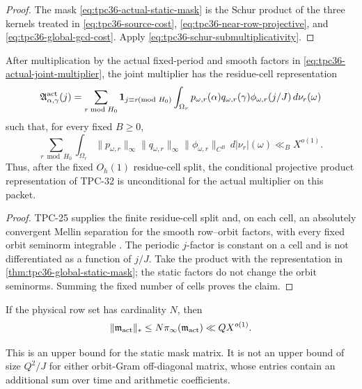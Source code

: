 \begin{proof}
The mask \eqref{eq:tpc36-actual-static-mask} is the Schur product of the
three kernels treated in \eqref{eq:tpc36-source-cost},
\eqref{eq:tpc36-near-row-projective}, and
\eqref{eq:tpc36-global-gcd-cost}.  Apply
\eqref{eq:tpc36-schur-submultiplicativity}.
\end{proof}

\begin{corollary}
\label{cor:tpc36-full-multiplier-reassembly}
After multiplication by the actual fixed-period and smooth factors in
\eqref{eq:tpc36-actual-joint-multiplier}, the joint multiplier has the
residue-cell representation
\begin{equation}
 \mathfrak A_{\alpha,\gamma}^{\rm act}(j)
 =\sum_{r\bmod H_0}\mathbf 1_{j\equiv r\!\!\!\pmod{H_0}}
 \int_{\Omega_r}p_{\omega,r}(\alpha)q_{\omega,r}(\gamma)
 \phi_{\omega,r}(j/J)\,d\nu_r(\omega)
 \label{eq:tpc36-full-multiplier-reassembly}
\end{equation}
such that, for every fixed \(B\ge0\),
\begin{equation}
 \sum_{r\bmod H_0}\int_{\Omega_r}
 \|p_{\omega,r}\|_\infty\|q_{\omega,r}\|_\infty
 \|\phi_{\omega,r}\|_{C^B}\,d|\nu_r|(\omega)
 \ll_B X^{o(1)}.
 \label{eq:tpc36-orbit-seminorm-cost}
\end{equation}
Thus, after the fixed \(O_h(1)\) residue-cell split, the conditional
projective product representation of TPC-32 is unconditional for the
actual multiplier on this packet.
\end{corollary}

\begin{proof}
TPC-25 supplies the finite residue-cell split and, on each cell, an
absolutely convergent Mellin separation for the smooth row--orbit factors,
with every fixed orbit seminorm integrable \citep{WangTPC25}.  The
periodic \(j\)-factor is constant on a cell and is not differentiated as a
function of \(j/J\).  Take the product with the representation in
\cref{thm:tpc36-global-static-mask}; the static factors do not change the
orbit seminorms.  Summing the fixed number of cells proves the claim.
\end{proof}

\begin{corollary}
\label{cor:tpc36-static-trace-norm}
If the physical row set has cardinality \(N\), then
\begin{equation}
 \|\mathfrak m_{\rm act}\|_*
 \le N\pi_{\infty}(\mathfrak m_{\rm act})
 \ll QX^{o(1)}.
 \label{eq:tpc36-static-trace-bound}
\end{equation}
\end{corollary}

This is an upper bound for the static mask matrix.  It is not an upper
bound of size \(Q^2/J\) for either orbit-Gram off-diagonal matrix, whose
entries contain an additional sum over time and arithmetic coefficients.
